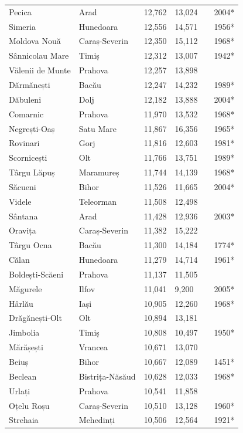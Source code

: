 \documentclass{article}
\begin{document}
\begin{tabular}{llllll}
Pecica & Arad & 12,762 & 13,024 &  & 2004* \\
Simeria & Hunedoara & 12,556 & 14,571 &  & 1956* \\
Moldova Nouă & Caraș-Severin & 12,350 & 15,112 &  & 1968* \\
Sânnicolau Mare & Timiș & 12,312 & 13,007 &  & 1942* \\
Vălenii de Munte & Prahova & 12,257 & 13,898 &  &  \\
Dărmănești & Bacău & 12,247 & 14,232 &  & 1989* \\
Dăbuleni & Dolj & 12,182 & 13,888 &  & 2004* \\
Comarnic & Prahova & 11,970 & 13,532 &  & 1968* \\
Negrești-Oaș & Satu Mare & 11,867 & 16,356 &  & 1965* \\
Rovinari & Gorj & 11,816 & 12,603 &  & 1981* \\
Scornicești & Olt & 11,766 & 13,751 &  & 1989* \\
Târgu Lăpuș & Maramureș & 11,744 & 14,139 &  & 1968* \\
Săcueni & Bihor & 11,526 & 11,665 &  & 2004* \\
Videle & Teleorman & 11,508 & 12,498 &  &  \\
Sântana & Arad & 11,428 & 12,936 &  & 2003* \\
Oravița & Caraș-Severin & 11,382 & 15,222 &  &  \\
Târgu Ocna & Bacău & 11,300 & 14,184 &  & 1774* \\
Călan & Hunedoara & 11,279 & 14,714 &  & 1961* \\
Boldești-Scăeni & Prahova & 11,137 & 11,505 &  &  \\
Măgurele & Ilfov & 11,041 & 9,200 &  & 2005* \\
Hârlău & Iași & 10,905 & 12,260 &  & 1968* \\
Drăgănești-Olt & Olt & 10,894 & 13,181 &  &  \\
Jimbolia & Timiș & 10,808 & 10,497 &  & 1950* \\
Mărășești & Vrancea & 10,671 & 13,070 &  &  \\
Beiuș & Bihor & 10,667 & 12,089 &  & 1451* \\
Beclean & Bistrița-Năsăud & 10,628 & 12,033 &  & 1968* \\
Urlați & Prahova & 10,541 & 11,858 &  &  \\
Oțelu Roșu & Caraș-Severin & 10,510 & 13,128 &  & 1960* \\
Strehaia & Mehedinți & 10,506 & 12,564 &  & 1921* \\

\end{tabular}
\end{document}
